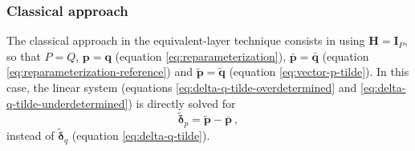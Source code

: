 %

\subsubsection{Classical approach}

The classical approach in the equivalent-layer technique consists in using $\mathbf{H} = \mathbf{I}_{P}$, 
so that $P = Q$, $\mathbf{p} = \mathbf{q}$ (equation \ref{eq:reparameterization}), $\bar{\mathbf{p}} = \bar{\mathbf{q}}$ (equation \ref{eq:reparameterization-reference}) and 
$\tilde{\mathbf{p}} = \tilde{\mathbf{q}}$ (equation \ref{eq:vector-p-tilde}).
In this case, the linear system (equations \ref{eq:delta-q-tilde-overdetermined} and \ref{eq:delta-q-tilde-underdetermined}) is directly 
solved for 
\begin{equation}
	\tilde{\boldsymbol{\delta}}_{p} = \tilde{\mathbf{p}} - \bar{\mathbf{p}} \: ,
	\label{eq:delta-p-tilde}
\end{equation}
instead of $\tilde{\boldsymbol{\delta}}_{q}$ (equation \ref{eq:delta-q-tilde}).

